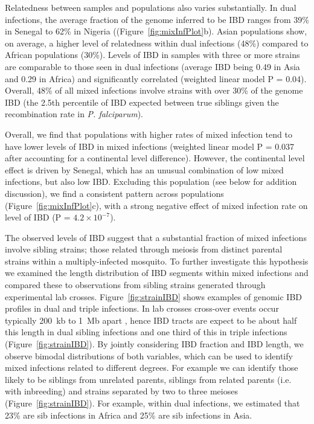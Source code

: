 \documentclass[9pt,lineno]{elife}
\begin{document}
Relatedness between samples and populations also varies substantially.  In dual infections, the average fraction of the genome inferred to be IBD ranges from 39\% in Senegal to 62\% in Nigeria ((Figure~\ref{fig:mixInfPlot}b).   Asian populations show, on average, a higher level of relatedness within dual infections (48\%) compared to African populations (30\%).  Levels of IBD in samples with three or more strains are comparable to those seen in dual infections (average IBD being 0.49 in Asia and 0.29 in Africa) and significantly correlated (weighted linear model P = 0.04).  Overall, 48\% of all mixed infections involve strains with over 30\% of the genome IBD (the 2.5th percentile of IBD expected between true siblings given the recombination rate in {\it P. falciparum}).

Overall, we find that populations with higher rates of mixed infection tend to have lower levels of IBD in mixed infections (weighted linear model P = 0.037 after accounting for a continental level difference).  However, the continental level effect is driven by Senegal, which has an unusual combination of low mixed infections, but also low IBD.  Excluding this population (see below for addition discussion), we find a consistent pattern across populations (Figure~\ref{fig:mixInfPlot}c), with a strong negative effect of mixed infection rate on level of IBD (P = $4.2\times10^{-7}$).

The observed levels of IBD suggest that a substantial fraction of mixed infections involve sibling strains; those related through meiosis from distinct parental strains within a multiply-infected mosquito.  To further investigate this hypothesis we examined the length distribution of IBD segments within mixed infections and compared these to observations from sibling strains generated through experimental lab crosses.  Figure~\ref{fig:strainIBD} shows examples of genomic IBD profiles in dual and triple infections.  In lab crosses cross-over events occur typically 200~kb to 1~Mb apart \citet{Miles2016}, hence IBD tracts are expect to be about half this length in dual sibling infections and one third of this in triple infections (Figure~\ref{fig:strainIBD}).  By jointly considering IBD fraction and IBD length, we observe bimodal distributions of both variables, which can be used to identify mixed infections related to different degrees.  For example we can identify those likely to be siblings from unrelated parents, siblings from related parents (i.e. with inbreeding) and strains separated by two to three meioses (Figure~\ref{fig:strainIBD}).  For example, within dual infections, we estimated that 23\% are sib infections in Africa and 25\% are sib infections in Asia.
\end{document}
